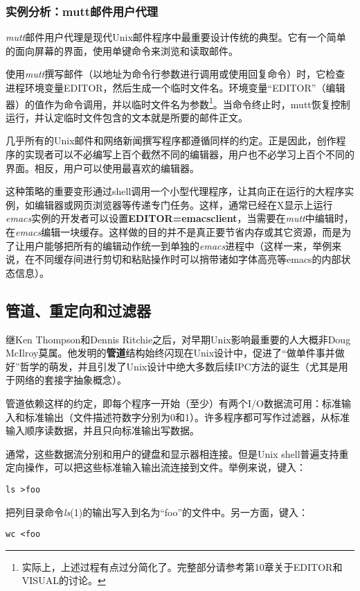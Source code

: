 \documentclass[12pt,oneside]{book}
\begin{document}
\begin{common-format}
\subsubsection{实例分析：mutt邮件用户代理}
\textit{mutt}邮件用户代理是现代Unix邮件程序中最重要设计传统的典型。它有一个简单的面向屏幕的界面，使用单键命令来浏览和读取邮件。

使用\textit{mutt}撰写邮件（以地址为命令行参数进行调用或使用回复命令）时，它检查进程环境变量EDITOR，然后生成一个临时文件名。环境变量“EDITOR”（编辑器）的值作为命令调用，并以临时文件名为参数\footnote{实际上，上述过程有点过分简化了。完整部分请参考第10章关于EDITOR和VISUAL的讨论。}。当命令终止时，mutt恢复控制运行，并认定临时文件包含的文本就是所要的邮件正文。

几乎所有的Unix邮件和网络新闻撰写程序都遵循同样的约定。正是因此，创作程序的实现者可以不必编写上百个截然不同的编辑器，用户也不必学习上百个不同的界面。相反，用户可以使用最喜欢的编辑器。

这种策略的重要变形通过shell调用一个小型代理程序，让其向正在运行的大程序实例，如编辑器或网页浏览器等传递专门任务。这样，通常已经在X显示上运行\textit{emacs}实例的开发者可以设置\textbf{EDITOR=emacsclient}，当需要在\textit{mutt}中编辑时，在\textit{emacs}编辑一块缓存。这样做的目的并不是真正要节省内存或其它资源，而是为了让用户能够把所有的编辑动作统一到单独的\textit{emacs}进程中（这样一来，举例来说，在不同缓存间进行剪切和粘贴操作时可以捎带诸如字体高亮等emacs的内部状态信息）。

\subsection{管道、重定向和过滤器}
继Ken Thompson和Dennis Ritchie之后，对早期Unix影响最重要的人大概非Doug McIlroy莫属。他发明的\textbf{管道}结构始终闪现在Unix设计中，促进了“做单件事并做好”哲学的萌发，并且引发了Unix设计中绝大多数后续IPC方法的诞生（尤其是用于网络的套接字抽象概念）。

管道依赖这样的约定，即每个程序一开始（至少）有两个I/O数据流可用：标准输入和标准输出（文件描述符数字分别为0和1）。许多程序都可写作过滤器，从标准输入顺序读数据，并且只向标准输出写数据。

通常，这些数据流分别和用户的键盘和显示器相连接。但是Unix shell普遍支持重定向操作，可以把这些标准输入输出流连接到文件。举例来说，键入：
\begin{Verbatim}
ls >foo
\end{Verbatim}


把列目录命令\textit{ls}(1)的输出写入到名为“foo”的文件中。另一方面，键入：
\begin{Verbatim}
wc <foo
\end{Verbatim}



\end{common-format}
\end{document}
